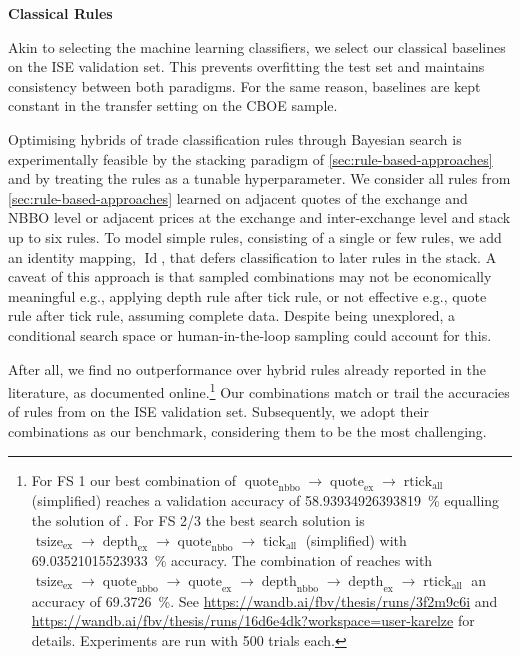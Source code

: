 
\textbf{Classical Rules}

Akin to selecting the machine learning classifiers, we select our classical baselines on the \gls{ISE} validation set. This prevents \gls{overfitting} the test set and maintains consistency between both paradigms. For the same reason, baselines are kept constant in the transfer setting on the \gls{CBOE} sample. 

Optimising hybrids of trade classification rules through Bayesian search is experimentally feasible by the stacking paradigm of \cref{sec:rule-based-approaches} and by treating the rules as a tunable hyperparameter. We consider all rules from \cref{sec:rule-based-approaches} learned on adjacent quotes of the exchange and \gls{NBBO} level or adjacent prices at the exchange and inter-exchange level and stack up to six rules. To model simple rules, consisting of a single or few rules, we add an identity mapping, $\operatorname{Id}$, that defers classification to later rules in the stack. A caveat of this approach is that sampled combinations may not be economically meaningful e.g., applying depth rule after tick rule, or not effective e.g., quote rule after tick rule, assuming complete data. Despite being unexplored, a conditional search space or human-in-the-loop sampling could account for this.

After all, we find no outperformance over hybrid rules already reported in the literature, as documented online.\footnote{For FS 1 our best combination of $\operatorname{quote}_{\mathrm{nbbo}} \to \operatorname{quote}_{\mathrm{ex}} \to \operatorname{rtick}_{\mathrm{all}}$ (simplified) reaches a validation accuracy of \SI{58.93934926393819}{\percent} equalling the solution of \textcite[][12]{grauerOptionTradeClassification2022}. For FS 2/3 the best search solution is $\operatorname{tsize}_{\mathrm{ex}} \to \operatorname{depth}_{\mathrm{ex}} \to \operatorname{quote}_{\mathrm{nbbo}} \to \operatorname{tick}_{\mathrm{all}}$ (simplified) with \SI{69.03521015523933}{\percent} accuracy. The combination of \textcite[][14]{grauerOptionTradeClassification2022} reaches with $\operatorname{tsize}_{\mathrm{ex}} \to \operatorname{quote}_{\mathrm{nbbo}} \to \operatorname{quote}_{\mathrm{ex}} \to \operatorname{depth}_{\mathrm{nbbo}} \to \operatorname{depth}_{\mathrm{ex}} \to \operatorname{rtick}_{\mathrm{all}}$ an accuracy of \SI{69.3726}{\percent}. See \url{https://wandb.ai/fbv/thesis/runs/3f2m9c6i} and \url{https://wandb.ai/fbv/thesis/runs/16d6e4dk?workspace=user-karelze} for details. Experiments are run with \num{500} trials each.} Our combinations match or trail the accuracies of rules from \textcite[][12--14]{grauerOptionTradeClassification2022} on the \gls{ISE} validation set. Subsequently, we adopt their combinations as our benchmark, considering them to be the most challenging.

